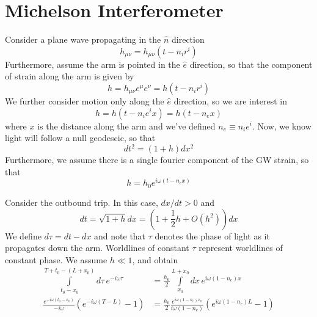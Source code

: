 \documentclass{article}
\begin{document}

\section*{Michelson Interferometer}

Consider a plane wave propagating in the $\hat{n}$ direction
\begin{equation}
    h_{\mu\nu} = h_{\mu\nu}(t-n_i r^i)
\end{equation}
Furthermore, assume the arm is pointed in the $\hat{e}$ direction, so that the component of strain along the arm is given by
\begin{equation}
    h = h_{\mu\nu}e^\mu e^\nu = h(t-n_i r^i)
\end{equation}
We further consider motion only along the $\hat{e}$ direction, so we are interest in
\begin{equation}
    h = h(t-n_i e^i x) = h(t-n_e x)
\end{equation}
where $x$ is the distance along the arm and we've defined $n_e\equiv n_i e^i$.
Now, we know light will follow a null geodescic, so that
\begin{equation}
    dt^2 = (1+h)dx^2
\end{equation}
Furthermore, we assume there is a single fourier component of the GW strain, so that
\begin{equation}
    h = h_0 e^{i\omega(t-n_e x)}
\end{equation}

Consider the outbound trip.
In this case, $dx/dt > 0$ and
\begin{equation}
    dt = \sqrt{1+h}dx = (1 + \frac{1}{2}h + O(h^2))dx
\end{equation}
We define $d\tau = dt-dx$ and note that $\tau$ denotes the phase of light as it propagates down the arm.
Worldlines of constant $\tau$ represent worldlines of constant phase.
We assume $h\ll1$, and obtain
\begin{align}
    \int\limits_{t_0-x_0}^{T+t_0 - (L+x_0)} d\tau\, e^{-i\omega\tau} & = \frac{h_0}{2} \int\limits_{x_0}^{L+x_0} dx\, e^{i\omega(1-n_e)x} \\
    \frac{e^{-i\omega(t_0-x_0)}}{-i\omega}\left(e^{-i\omega(T-L)} - 1\right) & = \frac{h_0}{2}\frac{e^{i\omega(1-n_e)x_0}}{i\omega(1-n_e)}\left( e^{i\omega(1-n_e)L} - 1 \right)
\end{align}
\end{document}
